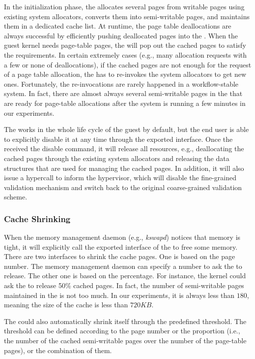In the initialization phase, the \cache allocates several pages from writable pages using existing system allocators, converts them into semi-writable pages, and maintains them in a dedicated cache list.
At runtime, the page table deallocations are always successful by efficiently pushing deallocated pages into the \cache.
When the guest kernel needs page-table pages, the \cache  will pop out the cached pages to satisfy the requirements.
In certain extremely cases (e.g., many allocation requests with a few or none of deallocations), if the cached pages are not enough for the request of a page table allocation, the \cache has to re-invokes the system allocators to get new ones.
Fortunately, the re-invocations are rarely happened in a workflow-stable system. 
In fact, there are almost always several semi-writable pages in the \cache that are ready for page-table allocations after the system is running a few minutes in our experiments.

The \cache works in the whole life cycle of the guest by default, but the end  user is able to explicitly disable it at any time through the exported interface.
Once the \cache received the disable command, it will release all resources, e.g., deallocating the cached pages through the existing system allocators and releasing the data structures that are used for managing the cached pages.
In addition, it will also issue a hypercall to inform the hypervisor, which will disable the fine-grained validation mechanism and switch back to the original coarse-grained validation scheme.

\subsubsection{Cache Shrinking}
When the memory management daemon (e.g., \emph{kswapd}) notices that memory is tight, it will explicitly call the exported interface of the \cache to free some memory.
There are two interfaces to shrink the cache pages. One is based on the page number. The memory management daemon can specify a number to ask the \cache to release.
The other one is based on the percentage. For instance, the kernel could ask the \cache to release 50\% cached pages.
In fact, the number of semi-writable pages maintained in the \cache is not too much. In our experiments, it is always less than $180$, meaning the size of the cache is less than $720KB$.

The \cache could also automatically shrink itself through the predefined threshold. 
The threshold can be defined according to the page number or the proportion (i.e., the number of the cached semi-writable pages over the number of the page-table pages), or the combination of them.






